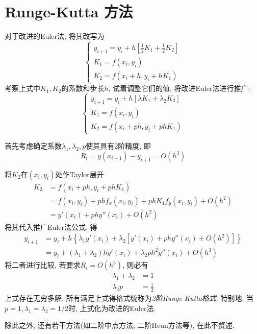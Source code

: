 \section{Runge-Kutta 方法}

对于改进的Euler法, 将其改写为
\begin{equation*}
    \begin{cases}
        y_{i+1}=y_i+h\left[\frac{1}{2}K_1+\frac{1}{2}K_2\right]\\
        K_1=f(x_i,y_i)\\
        K_2=f(x_i+h,y_i+hK_1)
    \end{cases}
\end{equation*}
考察上式中$K_1, K_2$的系数和步长$h$, 试着调整它们的值, 将改进Euler法进行推广:
\begin{equation*}
    \begin{cases}
        y_{i+1}=y_i+h[\lambda K_1+\lambda_2K_2]\\
        K_1=f(x_i,y_i)\\
        K_2=f(x_i+ph,y_i+phK_1)
    \end{cases}
\end{equation*}

首先考虑确定系数$\lambda_1,\lambda_2,p$使其具有2阶精度, 即
\begin{equation*}
    R_i=y(x_{i+1})-y_{i+1}=O(h^3)
\end{equation*}

将$K_2$在$(x_i,y_i)$处作Taylor展开
\begin{align*}
    K_2&=f(x_i+ph,y_i+phK_1)\\
    &=f(x_i,y_i)+phf_x(x_i,y_i)+phK_1f_y(x_i,y_i)+O(h^2)\\
    &=y'(x_i)+phy''(x_i)+O(h^2)
\end{align*}
将其代入推广Euler法公式, 得
\begin{align*}
    y_{i+1}&=y_i+h\left\{\lambda_1y'(x_i)+\lambda_2[y'(x_i)+phy''(x_i)+O(h^2)]\right\}\\
    &=y_i+(\lambda_1+\lambda_2)hy'(x_i)+\lambda_2ph^2y''(x_i)+O(h^3)
\end{align*}
将二者进行比较, 若要求$R_i=O(h^3)$, 则必有
\begin{align*}
    \lambda_1+\lambda_2&=1\\
    \lambda_2p&=\frac{1}{2}
\end{align*}
上式存在无穷多解, 所有满足上式得格式统称为\emph{2阶Runge-Kutta格式}. 特别地, 当$p=1,\lambda_1=\lambda_2=1/2$时, 上式化为改进的Euler法.

除此之外, 还有若干方法(如二阶中点方法, 二阶Heun方法等), 在此不赘述.

